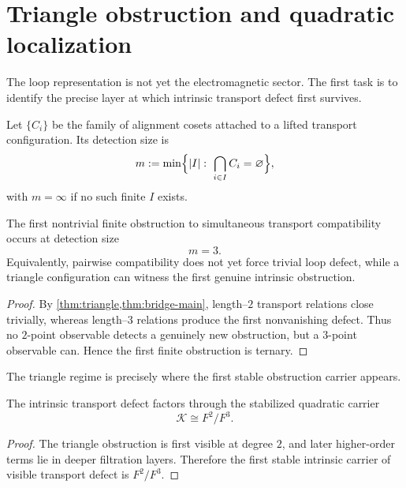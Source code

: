 \section{Triangle obstruction and quadratic localization}
\label{sec:em-triangle-localization}
The loop representation is not yet the electromagnetic sector.
The first task is to identify the precise layer at which intrinsic
transport defect first survives.
\begin{definition}
	Let \(\{C_i\}\) be the family of alignment cosets attached to a lifted
	transport configuration.
	Its detection size is
	\[
		m:=\min\Bigl\{|I|:\ \bigcap_{i\in I} C_i=\varnothing\Bigr\},
	\]
	with \(m=\infty\) if no such finite \(I\) exists.
\end{definition}
\begin{theorem}
	\label{thm:em-triangle-minimal}
	The first nontrivial finite obstruction to simultaneous transport
	compatibility occurs at detection size
	\[
		m=3.
	\]
	Equivalently, pairwise compatibility does not yet force trivial loop
	defect, while a triangle configuration can witness the first genuine
	intrinsic obstruction.
\end{theorem}
\begin{proof}
	By \cref{thm:triangle,thm:bridge-main}, length--\(2\)
	transport relations close trivially, whereas length--\(3\) relations
	produce the first nonvanishing defect.
	Thus no \(2\)-point observable detects a genuinely new obstruction, but
	a \(3\)-point observable can.
	Hence the first finite obstruction is ternary.
\end{proof}
The triangle regime is precisely where the first stable obstruction
carrier appears.
\begin{corollary}
	The intrinsic transport defect factors through the stabilized
	quadratic carrier
	\[
		\mathcal K \cong F^2/F^3.
	\]
\end{corollary}
\begin{proof}
	The triangle obstruction is first visible at degree \(2\), and later
	higher-order terms lie in deeper filtration layers.
	Therefore the first stable intrinsic carrier of visible transport
	defect is \(F^2/F^3\).
\end{proof}
